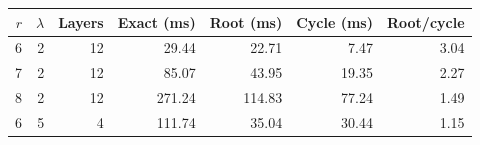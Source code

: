 \begin{tabular}{rrrrrrr}
\toprule
$r$ & $\lambda$ & Layers & Exact (ms) & Root (ms) & Cycle (ms) & Root/cycle\\
\midrule
6 & 2 & 12 & 29.44 & 22.71 & 7.47 & 3.04\\
7 & 2 & 12 & 85.07 & 43.95 & 19.35 & 2.27\\
8 & 2 & 12 & 271.24 & 114.83 & 77.24 & 1.49\\
6 & 5 & 4 & 111.74 & 35.04 & 30.44 & 1.15\\
\bottomrule
\end{tabular}
